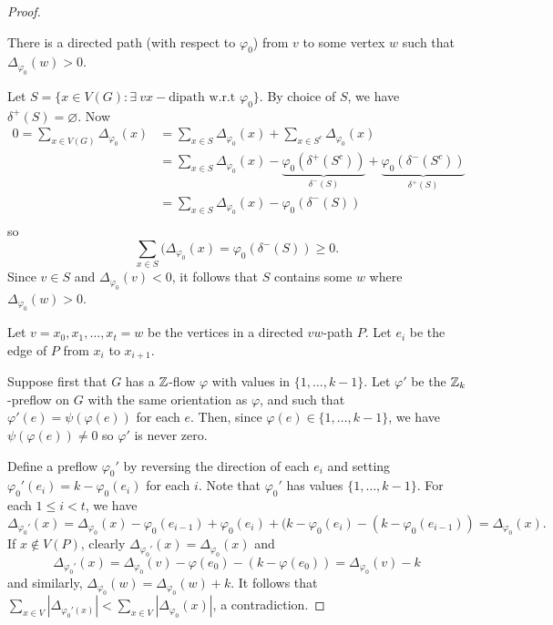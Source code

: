 \documentclass[main.tex]{subfiles}
\begin{document}
\begin{proof}
  \begin{claim}
    There is a directed path (with respect to $\varphi_0$) from $v$ to some
    vertex $w$ such that $\Delta_{\varphi_0}(w) > 0$.
  \end{claim}
  \begin{subproof}
    Let $S = \{x\in V(G) : \exists\ vx-\text{dipath w.r.t }\varphi_0\}$.
    By choice of $S$, we have $\delta^+(S) = \varnothing$.
    Now
    \begin{align*}
      0 = \sum_{x\in V(G)}\Delta_{\varphi_0}(x)
      &= \sum_{x\in S}\Delta_{\varphi_0}(x) + \sum_{x\in S^c}\Delta_{\varphi_0}(x) \\
      &= \sum_{x\in S}\Delta_{\varphi_0}(x)
          - \underbrace{\varphi_0(\delta^+(S^c))}_{\delta^-(S)}
          + \underbrace{\varphi_0(\delta^-(S^c))}_{\delta^+(S)} \\
      &= \sum_{x\in S}\Delta_{\varphi_0}(x) - \varphi_0(\delta^-(S)) \\
    \end{align*}
    so
    \[
      \sum_{x\in S}(\Delta_{\varphi_0}(x) = \varphi_0(\delta^-(S))\geq 0.
    \]
    Since $v\in S$ and $\Delta_{\varphi_0}(v) < 0$, it follows that $S$ contains
    some $w$ where $\Delta_{\varphi_0}(w) > 0$.
  \end{subproof}

  Let $v = x_0, x_1, \ldots, x_t = w$ be the vertices in a directed $vw$-path
  $P$.
  Let $e_i$ be the edge of $P$ from $x_i$ to $x_{i+1}$.

  Suppose first that $G$ has a $\mathbb Z$-flow $\varphi$ with values in $\{1,\ldots,k-1\}$.
  Let $\varphi'$ be the $\mathbb Z_k$-preflow on $G$ with the same orientation as $\varphi$,
  and such that $\varphi'(e) = \psi(\varphi(e))$ for each $e$.
  Then, since $\varphi(e)\in\{1,\ldots,k-1\}$, we have $\psi(\varphi(e))\neq 0$
  so $\varphi'$ is never zero.

  Define a preflow $\varphi_0'$ by reversing the direction of each $e_i$ and
  setting $\varphi_0'(e_i) = k - \varphi_0(e_i)$ for each $i$.
  Note that $\varphi_0'$ has values $\{1,\ldots,k-1\}$.
  For each $1\leq i < t$, we have
  \[
    \Delta_{\varphi_0'}(x) = \Delta_{\varphi_0}(x) - \varphi_0(e_{i-1})
    + \varphi_0(e_i) + (k - \varphi_0(e_i) - (k - \varphi_0(e_{i-1})) = \Delta_{\varphi_0}(x).
  \]
  If $x\notin V(P)$, clearly $\Delta_{\varphi_0'}(x) = \Delta_{\varphi_0}(x)$ and
  \[
    \Delta_{\varphi_0'}(x) = \Delta_{\varphi_0}(v) - \varphi(e_0) - (k - \varphi(e_0))
    = \Delta_{\varphi_0}(v) - k
  \]
  and similarly, $\Delta_{\varphi_0}(w) = \Delta_{\varphi_0}(w) + k$.
  It follows that
  $\sum_{x\in V}|\Delta_{\varphi_0'(x)}| < \sum_{x\in V}|\Delta_{\varphi_0}(x)|$,
  a contradiction.
\end{proof}
\end{document}
